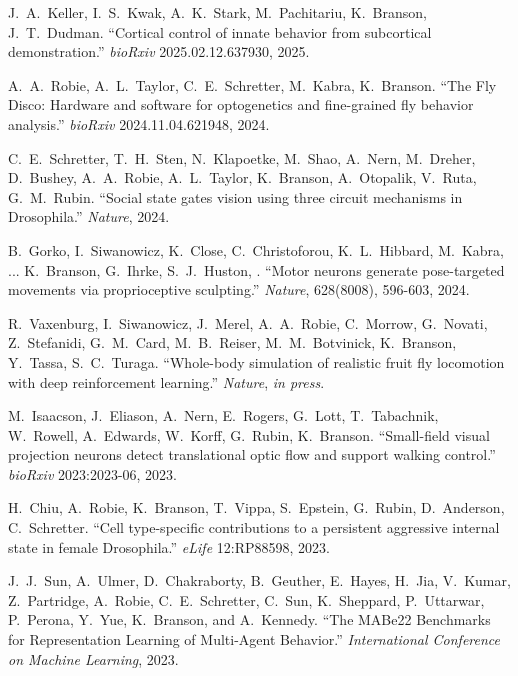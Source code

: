 \begin{cvenum}

\item  J.~A.~Keller, I.~S.~Kwak, A.~K.~Stark, M.~Pachitariu, K.~Branson, J.~T.~Dudman. ``Cortical control of innate behavior from subcortical demonstration.'' {\em bioRxiv} 2025.02.12.637930, 2025. 

\item A.~A.~Robie, A.~L.~Taylor, C.~E.~Schretter, M.~Kabra, K.~Branson. ``The {F}ly {D}isco: {H}ardware and software for optogenetics and fine-grained fly behavior analysis.'' {\em bioRxiv} 2024.11.04.621948, 2024.

\item C.~E.~Schretter, T.~H.~Sten, N.~Klapoetke, M.~Shao, A.~Nern, M.~Dreher, D.~Bushey, A.~A.~Robie, A.~L.~Taylor, K.~Branson, A.~Otopalik, V.~Ruta, G.~M.~Rubin. ``Social state gates vision using three circuit mechanisms in Drosophila.'' {\em Nature}, 2024.

\item B.~Gorko, I.~Siwanowicz, K.~Close, C.~Christoforou, K.~L.~Hibbard, M.~Kabra, ... K.~Branson, G.~Ihrke, S.~J.~Huston, . ``Motor neurons generate pose-targeted movements via proprioceptive sculpting.'' {\em Nature}, 628(8008), 596-603, 2024.

\item R.~Vaxenburg, I.~Siwanowicz, J.~Merel, A.~A.~Robie, C.~Morrow, G.~Novati, Z.~Stefanidi, G.~M.~Card, M.~B.~Reiser, M.~M.~Botvinick, K.~Branson, Y.~Tassa, S.~C.~Turaga. ``Whole-body simulation of realistic fruit fly locomotion with deep reinforcement learning.'' {\em Nature}, {\em in press}.

\item M.~Isaacson, J.~Eliason, A.~Nern, E.~Rogers, G.~Lott, T.~Tabachnik, W.~Rowell, A.~Edwards, W.~Korff, G.~Rubin, K.~Branson. ``Small-field visual projection neurons detect translational optic flow and support walking control.'' {\em bioRxiv} 2023:2023-06, 2023.

\item H.~Chiu, A.~Robie, K.~Branson, T.~Vippa, S.~Epstein, G.~Rubin, D.~Anderson, C.~Schretter. ``Cell type-specific contributions to a persistent aggressive internal state in female Drosophila.'' {\em eLife} 12:RP88598, 2023. 

\item J.~J.~Sun, A.~Ulmer, D.~Chakraborty, B.~Geuther, E.~Hayes, H.~Jia, V.~Kumar, Z.~Partridge, A.~Robie, C.~E.~Schretter,  C.~Sun, K.~Sheppard, P.~Uttarwar, P.~Perona, Y.~Yue, K.~Branson, and A.~Kennedy. ``The MABe22 Benchmarks for Representation Learning of Multi-Agent Behavior.'' {\em International Conference on Machine Learning}, 2023.


\end{cvenum}
